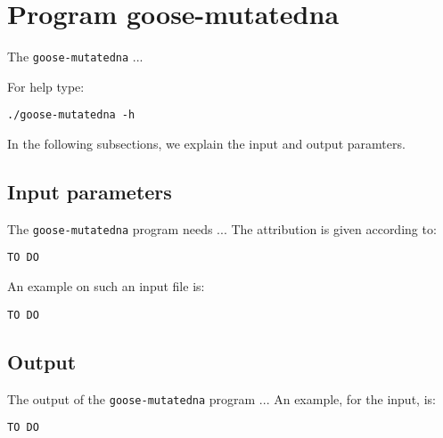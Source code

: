 \section{Program goose-mutatedna}
The \texttt{goose-mutatedna} ...

For help type:
\begin{lstlisting}
./goose-mutatedna -h
\end{lstlisting}
In the following subsections, we explain the input and output paramters.

\subsection*{Input parameters}

The \texttt{goose-mutatedna} program needs ...
The attribution is given according to:
\begin{lstlisting}
TO DO
\end{lstlisting}

An example on such an input file is:
\begin{lstlisting}
TO DO
\end{lstlisting}

\subsection*{Output}
The output of the \texttt{goose-mutatedna} program ...
An example, for the input, is:
\begin{lstlisting}
TO DO
\end{lstlisting}